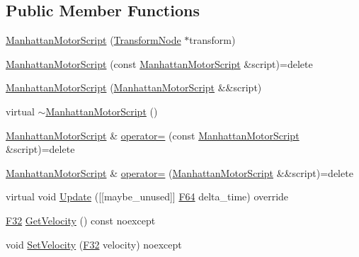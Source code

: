 \subsection*{Public Member Functions}
\begin{DoxyCompactItemize}
\item 
\hyperlink{classmage_1_1script_1_1_manhattan_motor_script_a398939e0ba281042f28ce9ca42187624}{Manhattan\+Motor\+Script} (\hyperlink{classmage_1_1_transform_node}{Transform\+Node} $\ast$transform)
\item 
\hyperlink{classmage_1_1script_1_1_manhattan_motor_script_ae18f69e5dd5c4ffd2c6aa9db01d86024}{Manhattan\+Motor\+Script} (const \hyperlink{classmage_1_1script_1_1_manhattan_motor_script}{Manhattan\+Motor\+Script} \&script)=delete
\item 
\hyperlink{classmage_1_1script_1_1_manhattan_motor_script_af8094bec366be50d60c4d6b04b77accb}{Manhattan\+Motor\+Script} (\hyperlink{classmage_1_1script_1_1_manhattan_motor_script}{Manhattan\+Motor\+Script} \&\&script)
\item 
virtual \hyperlink{classmage_1_1script_1_1_manhattan_motor_script_aca76d9d5be76b048ec247e93e4a89adb}{$\sim$\+Manhattan\+Motor\+Script} ()
\item 
\hyperlink{classmage_1_1script_1_1_manhattan_motor_script}{Manhattan\+Motor\+Script} \& \hyperlink{classmage_1_1script_1_1_manhattan_motor_script_a7a6280230faa4d42a141e1d7768bcd0d}{operator=} (const \hyperlink{classmage_1_1script_1_1_manhattan_motor_script}{Manhattan\+Motor\+Script} \&script)=delete
\item 
\hyperlink{classmage_1_1script_1_1_manhattan_motor_script}{Manhattan\+Motor\+Script} \& \hyperlink{classmage_1_1script_1_1_manhattan_motor_script_a2b185979a64b35d9f9d6f4027724560a}{operator=} (\hyperlink{classmage_1_1script_1_1_manhattan_motor_script}{Manhattan\+Motor\+Script} \&\&script)=delete
\item 
virtual void \hyperlink{classmage_1_1script_1_1_manhattan_motor_script_ae7fbaba1da04d00257e5d491868efc53}{Update} (\mbox{[}\mbox{[}maybe\+\_\+unused\mbox{]}\mbox{]} \hyperlink{namespacemage_ad26233bbec640deda836e572c1a23708}{F64} delta\+\_\+time) override
\item 
\hyperlink{namespacemage_aa97e833b45f06d60a0a9c4fc22ae02c0}{F32} \hyperlink{classmage_1_1script_1_1_manhattan_motor_script_a2f73545bf2fb507375251d530054ac9b}{Get\+Velocity} () const noexcept
\item 
void \hyperlink{classmage_1_1script_1_1_manhattan_motor_script_acf4db52ae6b0c9f97c0b7e719acea6bc}{Set\+Velocity} (\hyperlink{namespacemage_aa97e833b45f06d60a0a9c4fc22ae02c0}{F32} velocity) noexcept
\end{DoxyCompactItemize}
